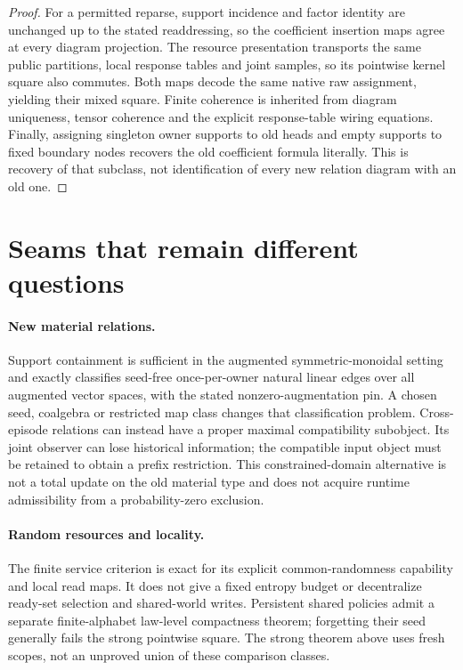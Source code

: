 \documentclass{article}
\begin{document}
\begin{proof}
For a permitted reparse, support incidence and factor identity are unchanged up to the stated readdressing, so the coefficient insertion maps agree at every diagram projection. The resource presentation transports the same public partitions, local response tables and joint samples, so its pointwise kernel square also commutes. Both maps decode the same native raw assignment, yielding their mixed square. Finite coherence is inherited from diagram uniqueness, tensor coherence and the explicit response-table wiring equations. Finally, assigning singleton owner supports to old heads and empty supports to fixed boundary nodes recovers the old coefficient formula literally. This is recovery of that subclass, not identification of every new relation diagram with an old one.
\end{proof}

\section{Seams that remain different questions}
\paragraph{New material relations.}
Support containment is sufficient in the augmented symmetric-monoidal setting and exactly classifies seed-free once-per-owner natural linear edges over all augmented vector spaces, with the stated nonzero-augmentation pin. A chosen seed, coalgebra or restricted map class changes that classification problem. Cross-episode relations can instead have a proper maximal compatibility subobject. Its joint observer can lose historical information; the compatible input object must be retained to obtain a prefix restriction. This constrained-domain alternative is not a total update on the old material type and does not acquire runtime admissibility from a probability-zero exclusion.

\paragraph{Random resources and locality.}
The finite service criterion is exact for its explicit common-randomness capability and local read maps. It does not give a fixed entropy budget or decentralize ready-set selection and shared-world writes. Persistent shared policies admit a separate finite-alphabet law-level compactness theorem; forgetting their seed generally fails the strong pointwise square. The strong theorem above uses fresh scopes, not an unproved union of these comparison classes.
\end{document}
